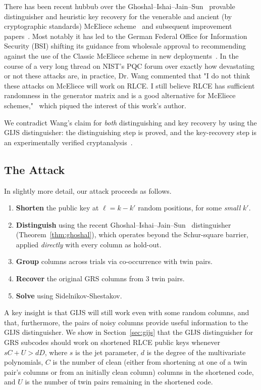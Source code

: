 There has been recent hubbub over the Ghoshal--Ishai--Jain--Sun~\cite{GIJS26}
provable distinguisher and heuristic key recovery for the venerable and ancient
(by cryptographic standards) McEliece scheme~\cite{McEliece1978} and subsequent
improvement papers~\cite{cryptoeprint:2026/1984}. Most notably it has led to
the German Federal Office for Information Security (BSI) shifting its guidance
from wholesale approval to recommending against the use of the Classic McEliece
scheme in new deployments~\cite{bsi2026classicmceliece}. In the course of a
very long thread on NIST's PQC forum over exactly how devastating or not these
attacks are, in practice, Dr. Wang commented that "I do not think these attacks
on McEliece will work on RLCE. I still believe RLCE has sufficient randomness
in the generator matrix and is a good alternative for McEliece
schemes,"~\cite{wang2026pqcforum} which piqued the interest of this work's
author.

We contradict Wang's claim for \emph{both} distinguishing and key recovery by
using the GIJS distinguisher: the distinguishing step is proved, and the
key-recovery step is an experimentally verified cryptanalysis~\cite{GIJS26}.

\subsection{The Attack}\label{sec:intro-attack}

In slightly more detail, our attack proceeds as follows.
\begin{enumerate}
      \item \textbf{Shorten} the public key at $\ell = k - k'$ random positions,
            for
            some \emph{small} $k'$.
      \item \textbf{Distinguish} using the recent
            Ghoshal--Ishai--Jain--Sun~\cite{GIJS26}
            distinguisher (Theorem~\ref{thm:ghoshal}), which operates beyond the
            Schur-square barrier, applied \emph{directly} with every column as
            hold-out.
      \item \textbf{Group} columns across trials via co-occurrence with twin pairs.
      \item \textbf{Recover} the original GRS columns from 3 twin pairs.
      \item \textbf{Solve} using Sidelnikov-Shestakov.
\end{enumerate}

A key insight is that GIJS will still work even with some random columns, and
that, furthermore, the pairs of noisy columns provide useful information to the
GIJS distinguisher. We show in Section~\ref{sec:gijs} that the GIJS
distinguisher for GRS subcodes should work on shortened RLCE public keys
whenever $sC + U > dD$, where $s$ is the jet parameter, $d$ is the degree of the
multivariate polynomials, $C$ is the number of clean (either from shortening at
one of a twin pair's columns or from an initially clean column) columns in the
shortened code, and $U$ is the number of twin pairs remaining in the shortened
code.

